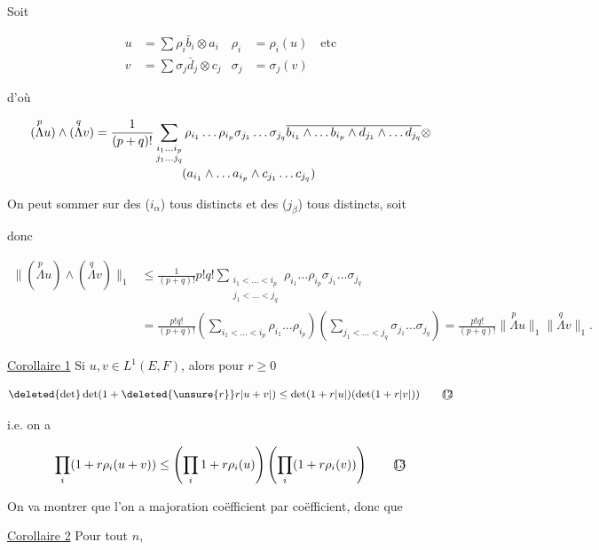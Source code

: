 Soit

\[
\begin{aligned}
u&=\sum\rho_i\bar b_i\otimes a_i & \rho_i&=\rho_i(u)\quad\text{etc}\\
v&=\sum\sigma_j\bar d_j\otimes c_j & \sigma_j&=\sigma_j(v)
\end{aligned}
\]

d'où

\[
\begin{aligned}
(\overset{p}{\Lambda}u)\wedge(\overset{q}{\Lambda}v)
&=\frac1{(p+q)!}\sum_{\substack{i_1\ldots i_p\\j_1\ldots j_q}}\rho_{i_1}\ldots\rho_{i_p}\sigma_{j_1}\ldots\sigma_{j_q}
\overline{b_{i_1}\wedge\ldots b_{i_p}\wedge d_{j_1}\wedge\ldots d_{j_q}}\otimes\\[-2pt]
&\hspace{25mm}(a_{i_1}\wedge\ldots a_{i_p}\wedge c_{j_1}\ldots c_{j_q})
\end{aligned}
\]

On peut sommer sur des ($i_\alpha$) tous distincts et des ($j_\beta$) tous distincts, soit

donc

\[
\begin{aligned}
\lVert(\overset{p}{\Lambda}u)\wedge(\overset{q}{\Lambda}v)\rVert_1
&\leq\frac{1}{(p+q)!}p!q!\sum_{\substack{i_1<\ldots<i_p\\j_1<\ldots<j_q}}\rho_{i_1}\ldots\rho_{i_p}\sigma_{j_1}\ldots\sigma_{j_q}\\
&=\frac{p!q!}{(p+q)!}\left(\sum_{i_1<\ldots<i_p}\rho_{i_1}\ldots\rho_{i_p}\right)
\left(\sum_{j_1<\ldots<j_q}\sigma_{j_1}\ldots\sigma_{j_q}\right)
=\frac{p!q!}{(p+q)!}\lVert\overset{p}{\Lambda}u\rVert_1\lVert\overset{q}{\Lambda}v\rVert_1 .
\end{aligned}
\]

\uline{Corollaire 1} Si $u,v\in L^1(E,F)$, alors  pour $r\geq0$

\[
\deleted{\det}\det(1+\deleted{\unsure{r}}r|u+v|)\leq\det(1+r|u|)(\det(1+r|v|))\tag*{\textcircled{12}}
\]

i.e. on a

\[
\prod_i(1+r\rho_i(u+v))\leq\left(\prod_i1+r\rho_i(u)\right)\left(\prod_i(1+r\rho_i(v))\right)\tag*{\textcircled{13}}
\]

On va  montrer que l'on a majoration coëfficient par coëfficient, donc que

\uline{Corollaire 2} Pour tout $n$,

